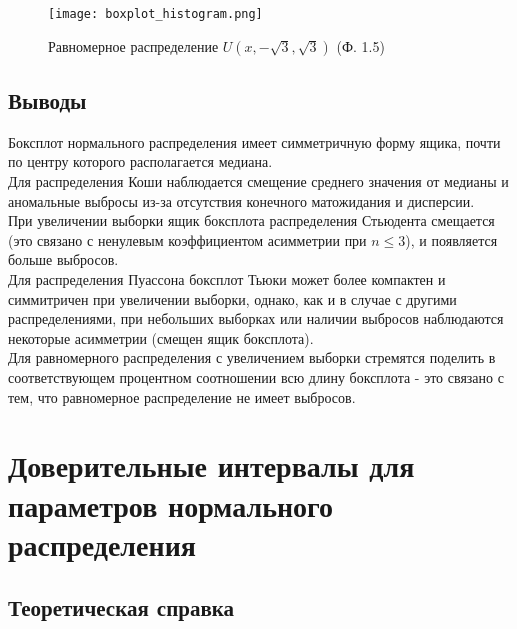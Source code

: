 \documentclass[14pt]{extarticle}
\begin{document}
\begin{figure}[H]
    \centering
    \texttt{[image: boxplot\_histogram.png]}
    \caption{Равномерное распределение \(U (x, -\sqrt{3}, \sqrt{3})\) (Ф. 1.5)}
    \label{fig:enter-label}
\end{figure}

\subsection{Выводы}

Боксплот нормального распределения имеет симметричную форму ящика, почти по центру которого располагается медиана.\\
Для распределения Коши наблюдается смещение среднего значения от медианы и аномальные выбросы из-за отсутствия конечного матожидания и дисперсии.\\
При увеличении выборки ящик боксплота распределения Стьюдента смещается (это связано с ненулевым коэффициентом асимметрии при \(n\leq 3\)), и появляется больше выбросов.\\
Для распределения Пуассона боксплот Тьюки может более компактен и симмитричен при увеличении выборки, однако, как и в случае с другими распределениями, при небольших выборках или наличии выбросов наблюдаются некоторые асимметрии (смещен ящик боксплота).\\
Для равномерного распределения с увеличением выборки стремятся поделить в соответствующем процентном соотношении всю длину боксплота - это связано с тем, что равномерное распределение не имеет выбросов.

\section{Доверительные интервалы для параметров нормального распределения}

\subsection{Теоретическая справка}
\end{document}
